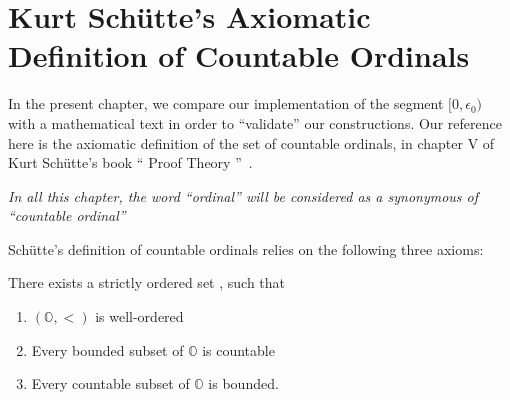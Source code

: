 










\chapter[Countable Ordinals (after Sch\"{u}tte)]{Kurt Schütte's Axiomatic Definition of Countable Ordinals}

\label{chap:schutte} 

In the present chapter, we  compare our implementation of the segment $[0,\epsilon_0)$ with a mathematical text in order to ``validate'' our constructions.
Our reference here is the axiomatic definition of the set of countable ordinals,
in chapter V of Kurt Schütte's book `` Proof Theory ''~\cite{schutte}.

\begin{remark}
\emph{In all this chapter, the word ``ordinal'' will be considered as a synonymous of
``countable ordinal''}  
\end{remark}



Schütte's definition of countable ordinals relies on the following three axioms:

There  exists a strictly ordered set , such that
\begin{enumerate}
\item  $(\mathbb{O},<)$ is well-ordered
\item Every bounded subset of $\mathbb{O}$  is countable
\item Every countable subset of $\mathbb{O}$  is bounded.
\end{enumerate}

